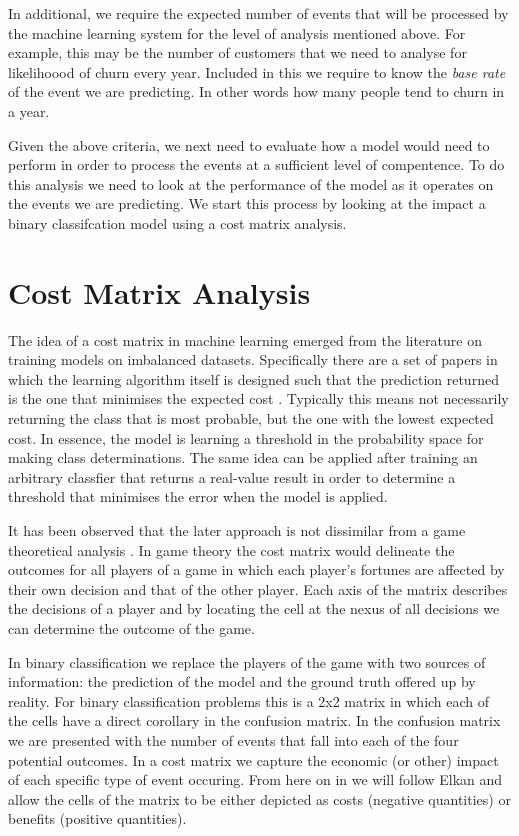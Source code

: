 \documentclass[12pt,a4paper]{article}
\numberwithin{equation}{section}
\begin{document}
In additional, we require the expected number of events that will be processed by the machine learning system for
the level of analysis mentioned above. For example, this may be the number of customers that we need to analyse
for likelihoood of churn every year. Included in
this we require to know the \textit{base rate} of the event we are predicting. In other words how many people tend to churn
in a year.

Given the above criteria, we next need to evaluate how a model would need to perform in order to process the events 
at a sufficient level of compentence. To do this analysis
we need to look at the performance of the model as it operates on the events we are predicting. We start this
process by looking at the impact a binary classifcation model using a cost matrix analysis.

\section{Cost Matrix Analysis}

The idea of a cost matrix in machine learning emerged from the literature on training models on imbalanced datasets. Specifically
there are a set of papers in which the learning algorithm itself is designed such that the prediction returned is the one that
minimises the expected cost \cite{Elkan2001,Margineantu2000}. 
Typically this means not necessarily returning the class that is most probable, but the one with the
lowest expected cost. In essence, the model is learning a threshold in the probability space for making class 
determinations. The same idea can be applied after training an arbitrary classfier that returns a real-value result
in order to determine a threshold that minimises the error when the model is applied.

It has been observed that the later approach is not dissimilar from a game theoretical analysis \cite{Sanchez17}. 
In game theory the cost matrix would delineate the outcomes for all players of a game in which each player's fortunes
are affected by their own decision and that of the other player. Each axis of the matrix describes the decisions of a player
and by locating the cell at the nexus of all decisions we can determine the outcome of the game.

In binary classification we replace the players of the game with two sources of information: the prediction of the model and
the ground truth offered up by reality. For binary classification problems this is a 2x2 matrix in which each of the cells have
a direct corollary in the confusion matrix. In the confusion matrix we are presented with the number of events that fall into
each of the four potential outcomes. In a cost matrix we capture the economic (or other) impact of each specific type of event
occuring. From here on in we will follow Elkan \cite{Elkan2001} and allow the cells of the matrix to be either depicted as 
costs (negative quantities) or benefits (positive quantities).
\end{document}
